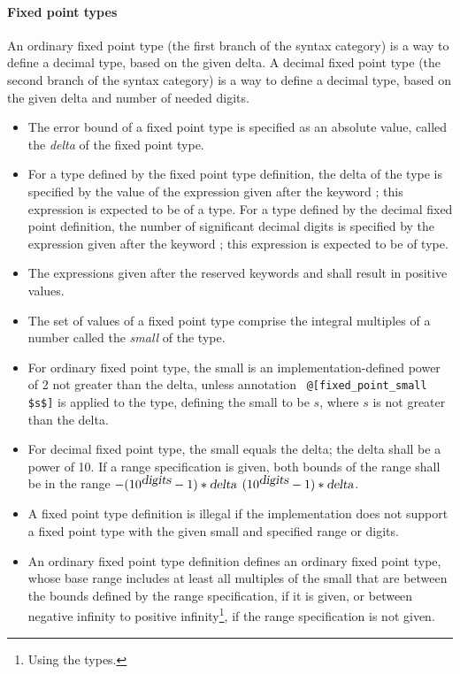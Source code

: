 \paragraph{Fixed point types}
An ordinary fixed point type (the first branch of the  syntax category) is a way to define a decimal type, based on the given delta. 
A decimal fixed point type (the second branch of the  syntax category) is a way to define a decimal type, based on the given delta and number of needed digits.  
\begin{itemize}
  \item[] The error bound of a fixed point type is specified as an absolute value, called the {\em delta} of the fixed point type. 
  \item[] For a type defined by the fixed point type definition, the delta of the type is specified by the value of the expression given after the keyword ; this expression is expected to be of a  type. For a type defined by the decimal fixed point definition, the number of significant decimal digits is specified by the expression given after the keyword ; this expression is expected to be of  type. 
  \item[] The expressions given after the reserved keywords  and  shall result in positive values. 
  \item[] The set of values of a fixed point type comprise the integral multiples of a number called the {\em small} of the type. 
  \item[] For ordinary fixed point type, the small is an implementation-defined power of 2 not greater than the delta, unless annotation ~\lstinline!@[fixed_point_small $s$]! is applied to the type, defining the small to be $s$, where $s$ is not greater than the delta. 
  \item[] For decimal fixed point type, the small equals the delta; the delta shall be a power of 10. If a range specification is given, both bounds of the range shall be in the range $-(10^{\mbox{\sl digits}}-1)*\mbox{\sl delta}$  $(10^{\mbox{\sl digits}}-1)*\mbox{\sl delta}$. 
  \item[] A fixed point type definition is illegal if the implementation does not support a fixed point type with the given small and specified range or digits. 
  \item[] An ordinary fixed point type definition defines an ordinary fixed point type, whose base range includes at least all multiples of the small that are between the bounds defined by the range specification, if it is given, or between negative infinity to positive infinity\footnote{Using the  types.}, if the range specification is not given.

\end{itemize}
